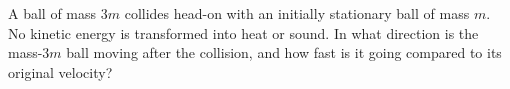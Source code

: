         A ball of mass $3m$ collides head-on with an initially stationary ball of
        mass $m$. No kinetic energy is transformed into heat or sound. In what direction
        is the mass-$3m$ ball moving after the collision, and how fast is it going
        compared to its original velocity?\answercheck
